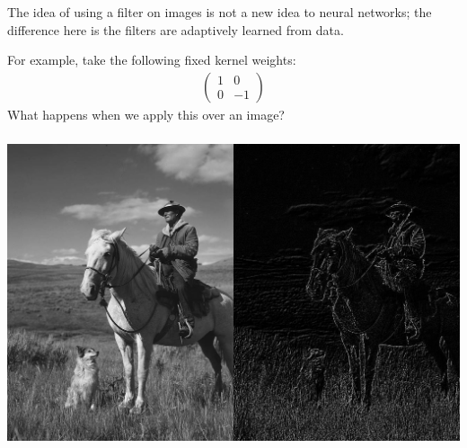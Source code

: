 \documentclass[xetex,mathserif,serif,aspectratio=169]{beamer}
\begin{document}
\begin{frame}[fragile] \frametitle{} \oldB \small

\textbf{}

The idea of using a filter on images is not a new idea to
neural networks; the difference here is the filters are
adaptively learned from data.

For example, take the following fixed kernel weights:
\begin{align*}
\left(\begin{array}{cc} 1 & 0 \\ 0 & -1 \end{array} \right)
\end{align*}
What happens when we apply this over an image?

\end{frame}

\begin{frame}[fragile] \frametitle{} \oldB \small

\begin{center}
\includegraphics[height=0.7\textheight]{img/both.jpg}
\end{center}

\end{frame}
\end{document}
